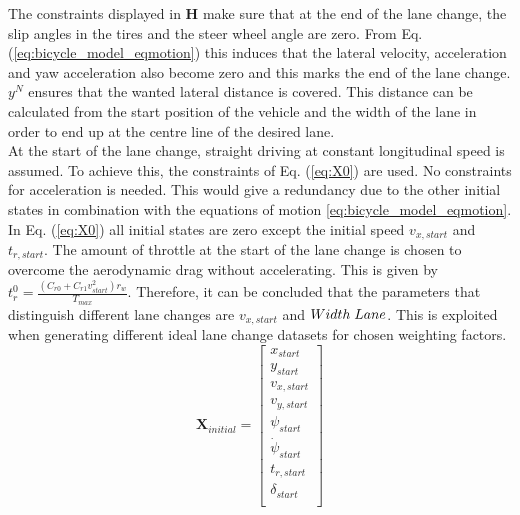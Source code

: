 The constraints displayed in $\bm{H}$ make sure that at the end of the lane change, the slip angles in the tires and the steer wheel angle are zero. From Eq. (\ref{eq:bicycle_model_eqmotion}) this induces that the lateral velocity, acceleration and yaw acceleration also become zero and this marks the end of the lane change. $y^N$ ensures that the wanted lateral distance is covered. This distance can be calculated from the start position of the vehicle and the width of the lane in order to end up at the centre line of the desired lane. \\ At the start of the lane change, straight driving at constant longitudinal speed is assumed. To achieve this, the constraints of Eq. (\ref{eq:X0}) are used. No constraints for acceleration is needed. This would give a redundancy due to the other initial states in combination with the equations of motion \ref{eq:bicycle_model_eqmotion}. In Eq. (\ref{eq:X0}) all initial states are zero except the initial speed $v_{x,start}$ and $t_{r,start}$. The amount of throttle at the start of the lane change is chosen to overcome the aerodynamic drag without accelerating. This is given by $t_r^0 = \frac{(C_{r0}+C_{r1}v_{start}^2)r_w}{T_{max}}$. Therefore, it can be concluded that the parameters that distinguish different lane changes are $v_{x,start}$ and $Width\hspace{1mm}Lane$. This is exploited when generating different ideal lane change datasets for chosen weighting factors. 
\newpage
\begin{equation}\label{eq:X0}
\bm{X}_{initial} =
\begin{bmatrix}
 x_{start}\\ 
 y_{start}\\
 v_{x,start}\\
 v_{y,start}\\
 \psi_{start}\\
 \dot{\psi}_{start}\\
 t_{r,start}\\
 \delta_{start}\\

\end{bmatrix}
\end{equation}



